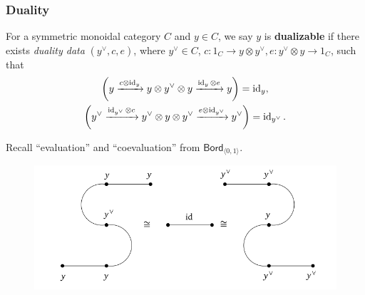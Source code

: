 \documentclass[xcolor=dvipsnames]{beamer}
\begin{document}
\begingroup
\small
\begin{frame}
    \frametitle{Duality} 
    \begin{definition}
  For a symmetric monoidal category $C$ and $y \in C$, we say $y$ is \textbf{dualizable} if there exists \emph{duality data} $(y ^{\vee},c,e)$, where $y ^{\vee} \in C$, $c \colon 1_C \to y \otimes y ^{\vee}, e \colon  y^{\vee}\otimes y \to 1_C$, such that
        \begin{gather}
            \left( y \xrightarrow{c\otimes\operatorname{id}_y} y\otimes y^{\vee}\otimes y\xrightarrow{\operatorname{id}_y \otimes e}y \right)=\operatorname{id}_y ,\\
        \left( y ^{\vee}\xrightarrow{\operatorname{id}_{y^{\vee}} \otimes c} y ^{\vee}\otimes y \otimes y ^{\vee}\xrightarrow{e \otimes \operatorname{id}_{y ^{\vee}} } y ^{\vee}\right)         =\operatorname{id} _{y ^{\vee}}.
    \end{gather}
    \end{definition}
    \begin{example}
        Recall ``evaluation'' and ``coevaluation'' from $\mathsf{Bord}_{\langle 0,1 \rangle } $. 
        \begin{figure}[H]
        \centering
         \includegraphics[width=0.5\linewidth]{figures/szdiagram.png}
        \end{figure}
    \end{example}
\end{frame}
\end{document}
